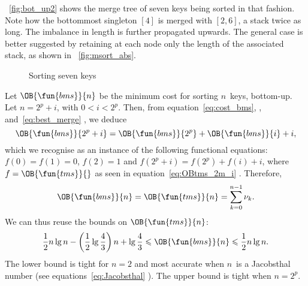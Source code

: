 \Fig~\vref{fig:bot_up2} shows the merge tree
of seven keys being sorted in that fashion. Note how the bottommost
singleton \([4]\) is merged with \([2,6]\), a stack twice as long. The
imbalance in length is further propagated upwards. The general case is
better suggested by retaining at each node only the length of the
associated stack, as shown in \fig~\vref{fig:msort_abs}.
\begin{figure}
\centering
{}
\qquad
{}
\caption{Sorting seven keys}
\end{figure}


Let \(\OB{\fun{bms}}{n}\) be the
minimum cost for sorting \(n\)~keys, bottom\hyp{}up. Let \(n=2^p+i\),
with \(0 < i < 2^p\). Then, from equation~\eqref{eq:cost_bms},
, and~\eqref{eq:best_merge}
, we deduce
\begin{equation*}
\OB{\fun{bms}}{2^p+i} = \OB{\fun{bms}}{2^p} + \OB{\fun{bms}}{i} + i,
\end{equation*}
which we recognise as an instance of the following functional
equations: \(f(0)=f(1)=0\), \(f(2)=1\) and \(f(2^p+i) = f(2^p) + f(i)
+ i\), where \(f=\OB{\fun{tms}}{}\) as seen in
equation~\eqref{eq:OBtms_2m_i} . Therefore,
\begin{equation}
\OB{\fun{bms}}{n} = \OB{\fun{tms}}{n} = \sum_{k=0}^{n-1}{\nu_k}.
\label{eq:OBbms}
\end{equation}
We can thus reuse the bounds on \(\OB{\fun{tms}}{n}\):
\begin{equation}
\frac{1}{2}n\lg n - \left(\frac{1}{2}\lg\frac{4}{3}\right)n + \lg\frac{4}{3}
\leqslant \OB{\fun{bms}}{n} \leqslant
\frac{1}{2}n\lg n.
\index{bms@$\OB{\fun{bms}}{n}$}
\end{equation}
The lower bound is tight for \(n=2\) and most accurate when \(n\)~is a
Jacobsthal number (see
equations~\eqref{eq:Jacobsthal} ). The upper
bound is tight when \(n=2^p\).


